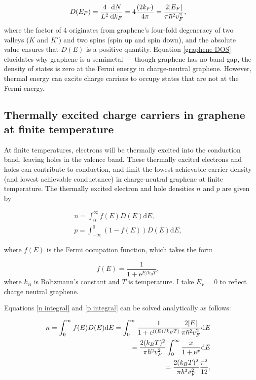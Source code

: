 \documentclass[double,12pt,1in]{beavtex}
\begin{document}
\begin{equation}
    D(E_F) = \frac{4}{L^2} \derivative{N}{k_F} = 4\frac{(2k_F)}{4 \pi} = \frac{2\abs{E_F}}{\pi \hbar^2 v_F^2}, \label{graphene DOS}
\end{equation}
where the factor of 4 originates from graphene's four-fold degeneracy of two valleys ($K$ and $K'$) and two spins (spin up and spin down), and the absolute value ensures that $D(E)$ is a positive quantity. Equation \ref{graphene DOS} elucidates why graphene is a semimetal — though graphene has no band gap, the density of states is zero at the Fermi energy in charge-neutral graphene. However, thermal energy can excite charge carriers to occupy states that are not at the Fermi energy.

\subsection{Thermally excited charge carriers in graphene at finite temperature}
At finite temperatures, electrons will be thermally excited into the conduction band, leaving holes in the valence band. These thermally excited electrons and holes can contribute to conduction, and limit the lowest achievable carrier density (and lowest achievable conductance) in charge-neutral graphene at finite temperature. The thermally excited electron and hole densities $n$ and $p$ are given by

\begin{gather}
        n = \int_{0}^{\infty}f(E) D(E)\mathrm{d}E, \label{n integral} \\ 
        p = \int_{-\infty}^{0}(1- f(E)) D(E)\mathrm{d}E, \label{p integral}
\end{gather}

where $f(E)$ is the Fermi occupation function, which takes the form

\begin{equation}
    f(E) = \frac{1}{1+\mathrm{e}^{E/k_B T}},
\end{equation}
where $k_B$ is Boltzmann's constant and $T$ is temperature. I take $E_F = 0$ to reflect charge neutral graphene.

Equations \ref{n integral} and \ref{p integral} can be solved analytically as follows:

\begin{equation}
    \begin{split}
        n = \int_{0}^{\infty}f(E) D(E)\mathrm{d}E 
        = \int_{0}^{\infty}\frac{1}{1+\mathrm{e}^{((E)/k_B T)}} \frac{2\abs{E}}{\pi \hbar^2 v_F^2}\mathrm{d}E \\
        = \frac{2(k_B T)^2}{\pi \hbar^2 v_F^2}\int_{0}^{\infty}\frac{x}{1+\mathrm{e}^{x}}\mathrm{d}E \\
        = \frac{2(k_B T)^2}{\pi\hbar^2 v_F^2} \frac{\pi^2}{12}, \label{n density}
    \end{split}
\end{equation}
\end{document}
